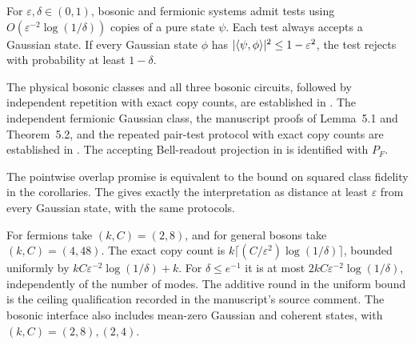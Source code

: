 \begin{theorem}\label{target:measurement-endpoints}
  \par
  \leanok
  For $\varepsilon,\delta\in(0,1)$, bosonic and fermionic systems admit tests
  using $O(\varepsilon^{-2}\log(1/\delta))$ copies of a pure state $\psi$.
  Each test always accepts a Gaussian state. If every Gaussian state
  $\phi$ has $\lvert\langle \psi, \phi\rangle\rvert^2\le1-\varepsilon^2$, the test rejects with
  probability at least $1-\delta$.

  The physical bosonic classes and all three bosonic
  circuits, followed by independent repetition with exact copy counts,
  are established in .
  The independent fermionic Gaussian class, the manuscript proofs of
  Lemma~5.1 and Theorem~5.2, and the repeated pair-test protocol with exact
  copy counts are established in .
  The accepting Bell-readout projection in 
  is identified with $P_F$.

  The pointwise overlap promise is equivalent to the bound on squared
  class fidelity in the corollaries. The
  gives exactly the interpretation as distance at least $\varepsilon$
  from every Gaussian state, with the same protocols.

  For fermions take $(k,C)=(2,8)$, and for general bosons take
  $(k,C)=(4,48)$. The exact copy count is
  $k\lceil(C/\varepsilon^2)\log(1/\delta)\rceil$, bounded uniformly by
  $kC\varepsilon^{-2}\log(1/\delta)+k$.
  For $\delta\le e^{-1}$ it is at most
  $2kC\varepsilon^{-2}\log(1/\delta)$, independently of the number of modes.
  The additive round in the uniform bound is the ceiling qualification
  recorded in the manuscript's source comment. The bosonic interface also
  includes mean-zero Gaussian and coherent states, with $(k,C)=(2,8),(2,4)$.
\end{theorem}
